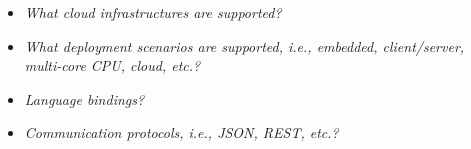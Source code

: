 
\begin{itemize}
\item \emph{What cloud infrastructures are supported?}
\item \emph{What deployment scenarios are supported, i.e., embedded, client/server, multi-core CPU, cloud, etc.?}
\item \emph{Language bindings?}
\item \emph{Communication protocols, i.e., JSON, REST, etc.?}
\end{itemize}